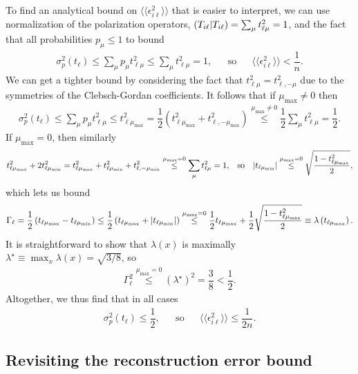 \documentclass[nofootinbib,twocolumn]{revtex4-1}
\renewcommand{\t}{\text} %
\newcommand{\f}[2]{\dfrac{#1}{#2}} %
\newcommand{\p}[1]{\left(#1\right)} %
\newcommand{\bbk}[1]{\langle\!\langle #1 \rangle\!\rangle}
\def\obk#1{\mathinner{({#1})}}
\begin{document}
To find an analytical bound on $\bbk{\epsilon_{i\ell}^2}$ that is easier to interpret, we can use normalization of the polarization operators, $\obk{T_{i\ell}|T_{i\ell}}=\sum_\mu t_{\ell\mu}^2 = 1$, and the fact that all probabilities $p_\mu\le1$ to bound
\begin{align}
  \sigma_p^2\p{t_\ell} \le \sum_\mu p_\mu t_{\ell\mu}^2
  \le \sum_\mu t_{\ell\mu}^2 = 1,
  &&
  \t{so}
  &&
  \bbk{\epsilon_{i\ell}^2} < \f1n.
\end{align}
We can get a tighter bound by considering the fact that $t_{\ell\mu}^2 = t_{\ell,-\mu}^2$ due to the symmetries of the Clebsch-Gordan coefficients.
It follows that if $\mu_{\t{max}}\ne0$ then
\begin{align}
  \sigma_p^2\p{t_\ell} \le \sum_\mu p_\mu t_{\ell\mu}^2
  \le t_{\ell\mu_{\t{max}}}^2
  = \f12 \p{t_{\ell\mu_{\t{max}}}^2 + t_{\ell,-\mu_{\t{max}}}^2}
  \stackrel{\mu_{\t{max}}\ne0}{\le} \f12 \sum_\mu t_{\ell\mu}^2
  = \f12.
\end{align}
If $\mu_{\t{max}}=0$, then similarly
\begin{align}
  t_{\ell\mu_{\t{max}}}^2 + 2 t_{\ell\mu_{\t{min}}}^2
  = t_{\ell\mu_{\t{max}}}^2 + t_{\ell\mu_{\t{min}}}^2
  + t_{\ell,-\mu_{\t{min}}}^2
  \stackrel{\mu_{\t{max}}=0}{\le}
  \sum_\mu t_{\ell\mu}^2 = 1,
  &&
  \t{so}
  &&
  \abs{t_{\ell\mu_{\t{min}}}}
  \stackrel{\mu_{\t{max}}=0}{\le}
  \sqrt{\f{1 - t_{\ell\mu_{\t{max}}}^2}{2}},
\end{align}
which lets us bound
\begin{align}
  \Gamma_\ell
  = \f12 \p{t_{\ell\mu_{\t{max}}} - t_{\ell\mu_{\t{min}}}}
  \le \f12 \p{t_{\ell\mu_{\t{max}}} + \abs{t_{\ell\mu_{\t{min}}}}}
  \stackrel{\mu_{\t{max}}=0}{\le}
  \f12 t_{\ell\mu_{\t{max}}}
  + \f12\sqrt{\f{1 - t_{\ell\mu_{\t{max}}}^2}{2}}
  \equiv \lambda\p{t_{\ell\mu_{\t{max}}}}.
\end{align}
It is straightforward to show that $\lambda\p{x}$ is maximally $\lambda^\star\equiv \max_x \lambda\p{x} = \sqrt{3/8}$, so
\begin{align}
  \Gamma_\ell^2
  \stackrel{\mu_{\t{max}}=0}{\le} \p{\lambda^\star}^2
  = \f38 < \f12.
\end{align}
Altogether, we thus find that in all cases
\begin{align}
  \sigma_p^2\p{t_\ell} \le \f12,
  &&
  \t{so}
  &&
  \bbk{\epsilon_{i\ell}^2} \le \f1{2n}.
\end{align}

\subsection{Revisiting the reconstruction error bound}
\label{sec:revisiting}
\end{document}
